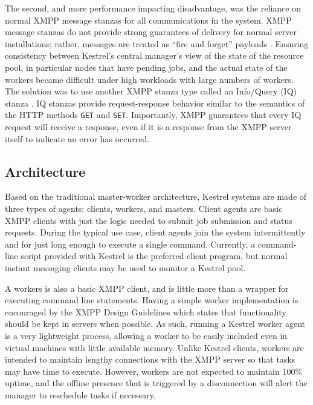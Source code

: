 The second, and more performance impacting disadvantage, was the reliance
on normal XMPP message stanzas for all communications in the system.
XMPP message stanzas do not provide strong guarantees of delivery
for normal server installations; rather, messages are treated as {}``fire
and forget'' payloads \cite{Saint-Andre2004a}. Ensuring consistency
between Kestrel's central manager's view of the state of the resource
pool, in particular nodes that have pending jobs, and the actual state
of the workers became difficult under high workloads with large numbers
of workers. The solution was to use another XMPP stanza type called
an Info/Query (IQ) stanza \cite{Saint-Andre2004a}. IQ stanzas provide
request-response behavior similar to the semantics of the HTTP methods
\texttt{GET} and \texttt{SET}. Importantly, XMPP guarantees that every
IQ request will receive a response, even if it is a response from
the XMPP server itself to indicate an error has occurred.


\subsection{Architecture}

\label{sec:Kestrel:Architecture} Based on the traditional master-worker
architecture, Kestrel systems are made of three types of agents: clients,
workers, and masters. Client agents are basic XMPP clients with just
the logic needed to submit job submission and status requests. During
the typical use case, client agents join the system intermittently
and for just long enough to execute a single command. Currently, a
command-line script provided with Kestrel is the preferred client
program, but normal instant messaging clients may be used to monitor
a Kestrel pool.

A workers is also a basic XMPP client, and is little more than a wrapper
for executing command line statements. Having a simple worker implementation
is encouraged by the XMPP Design Guidelines \cite{XEP-0134} which
states that functionality should be kept in servers when possible.
As such, running a Kestrel worker agent is a very lightweight process,
allowing a worker to be easily included even in virtual machines with
little available memory. Unlike Kestrel clients, workers are intended
to maintain lengthy connections with the XMPP server so that tasks
may have time to execute. However, workers are not expected to maintain
100\% uptime, and the offline presence that is triggered by a disconnection
will alert the manager to reschedule tasks if necessary.

